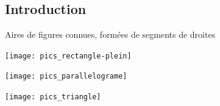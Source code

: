 \subsection{Introduction}
\begin{frame}{Aires de figures connues, formées de segments de droites}
  \begin{center}
    \texttt{[image: pics\_rectangle-plein]}
  \end{center}\pause{}
  
  \begin{center}
    \texttt{[image: pics\_parallelograme]}
  \end{center}\pause{}

  \begin{center}
    \texttt{[image: pics\_triangle]}
  \end{center}
\end{frame}

